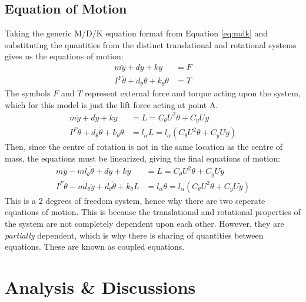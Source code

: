 \documentclass[11pt]{article}
\begin{document}
\subsection*{Equation of Motion}\label{sec:eom}
Taking the generic M/D/K equation format from Equation \ref{eq:mdk} and substituting the quantities from the distinct translational and rotational systems gives us the equations of motion:
\begin{align*}
  m\ddot{y} + d\dot{y} + ky &= F \\
  I^F\ddot{\theta} + d_{\theta}\dot{\theta} + k_{\theta}\theta &= T
\end{align*}
The symbols $F$ and $T$ represent external force and torque acting upon the system, which for this model is just the lift force acting at point A.
\begin{align*}
  m\ddot{y} + d\dot{y} + ky &= L = C_{\theta}U^2\theta + C_yU\dot{y} \\
  I^F\ddot{\theta} + d_{\theta}\dot{\theta} + k_{\theta}\theta &= l_{\alpha}L = l_{\alpha}(C_{\theta}U^2\theta + C_yU\dot{y})
\end{align*}
Then, since the centre of rotation is not in the same location as the centre of mass, the equations must be linearized, giving the final equations of motion:
\begin{align}
  m\ddot{y} - ml_{\theta}\ddot{\theta} + d\dot{y} + ky &= L = C_{\theta}U^2\theta + C_yU\dot{y}\label{eq:eom1} \\
  I^F\ddot{\theta} - ml_{\theta}\ddot{y} + d_{\theta}\dot{\theta} + k_{\theta}L &= l_{\alpha}\theta = l_{\alpha}(C_{\theta}U^2\theta + C_yU\dot{y})\label{eq:eom2}
\end{align}
This is a 2 degrees of freedom system, hence why there are two seperate equations of motion. This is because the translational and rotational properties of the system are not completely dependent upon each other. However, they are \textsl{partially} dependent, which is why there is sharing of quantities between equations. These are known as coupled equations.

\section*{Analysis \& Discussions}\label{sec:anal_disc}
\end{document}
